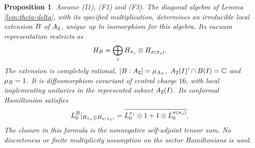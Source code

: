 \documentclass[leqno]{article}
\newcommand{\Cbb}{\ensuremath{\mathbb{C}}}
\let\cal\relax
\newcommand{\cal}{\mathcal}
\newcommand{\ot}{\otimes}
\newtheorem{prop}[thm]{Proposition}
\numberwithin{equation}{section}
\begin{document}
\begin{prop}
\label{prop:net-B}
Assume \textup{(I1)}, \textup{(F1)} and \textup{(F3)}. The diagonal algebra of Lemma \ref{lem:theta-delta}, with its specified multiplication, determines an irreducible local extension $\cal B$ of $\cal A_2$, unique up to isomorphism for this algebra. Its vacuum representation restricts as
\begin{equation}
\label{eq:HB-decomposition}
\cal H_{\cal B} = \bigoplus_z \cal H_{\pi_z} \ot \cal H_{\sigma(\pi_z)}.
\end{equation}
The extension is completely rational, $[\cal B:\cal A_2] = \mu_{\cal A_S}$, $\cal A_2(I)' \cap \cal B(I) = \Cbb$ and $\mu_{\cal B} = 1$. It is diffeomorphism covariant of central charge $16$, with local implementing unitaries in the represented subnet $\cal A_2(I)$. Its conformal Hamiltonian satisfies
\begin{equation}
\label{eq:diagonal-Hamiltonian}
L_0^{\cal B}|_{\cal H_{\pi_z}\ot\cal H_{\sigma(\pi_z)}} = \overline{L_0^{\pi_z}\ot 1+1\ot L_0^{\sigma(\pi_z)}}.
\end{equation}
The closure in this formula is the nonnegative self-adjoint tensor sum. No discreteness or finite multiplicity assumption on the sector Hamiltonians is used.
\end{prop}
\end{document}
